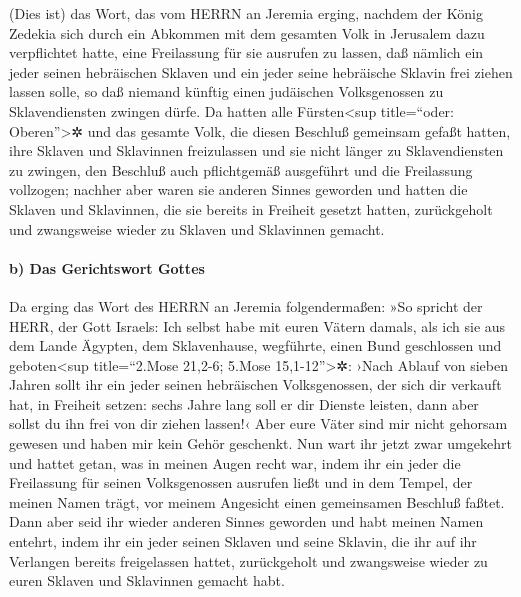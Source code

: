 (Dies ist) das Wort, das vom HERRN an Jeremia erging,
nachdem der König Zedekia sich durch ein Abkommen mit dem gesamten Volk
in Jerusalem dazu verpflichtet hatte, eine Freilassung für sie ausrufen
zu lassen, daß nämlich ein jeder seinen hebräischen
Sklaven und ein jeder seine hebräische Sklavin frei ziehen lassen solle,
so daß niemand künftig einen judäischen Volksgenossen zu Sklavendiensten
zwingen dürfe. Da hatten alle Fürsten\textless sup
title=``oder: Oberen''\textgreater✲ und das gesamte Volk, die diesen
Beschluß gemeinsam gefaßt hatten, ihre Sklaven und Sklavinnen
freizulassen und sie nicht länger zu Sklavendiensten zu zwingen, den
Beschluß auch pflichtgemäß ausgeführt und die Freilassung vollzogen;
nachher aber waren sie anderen Sinnes geworden und hatten
die Sklaven und Sklavinnen, die sie bereits in Freiheit gesetzt hatten,
zurückgeholt und zwangsweise wieder zu Sklaven und Sklavinnen gemacht.

\hypertarget{b-das-gerichtswort-gottes}{%
\paragraph{b) Das Gerichtswort Gottes}\label{b-das-gerichtswort-gottes}}

Da erging das Wort des HERRN an Jeremia folgendermaßen:
»So spricht der HERR, der Gott Israels: Ich selbst habe
mit euren Vätern damals, als ich sie aus dem Lande Ägypten, dem
Sklavenhause, wegführte, einen Bund geschlossen und geboten\textless sup
title=``2.Mose 21,2-6; 5.Mose 15,1-12''\textgreater✲:
›Nach Ablauf von sieben Jahren sollt ihr ein jeder seinen
hebräischen Volksgenossen, der sich dir verkauft hat, in Freiheit
setzen: sechs Jahre lang soll er dir Dienste leisten, dann aber sollst
du ihn frei von dir ziehen lassen!‹ Aber eure Väter sind mir nicht
gehorsam gewesen und haben mir kein Gehör geschenkt. Nun
wart ihr jetzt zwar umgekehrt und hattet getan, was in meinen Augen
recht war, indem ihr ein jeder die Freilassung für seinen Volksgenossen
ausrufen ließt und in dem Tempel, der meinen Namen trägt, vor meinem
Angesicht einen gemeinsamen Beschluß faßtet. Dann aber
seid ihr wieder anderen Sinnes geworden und habt meinen Namen entehrt,
indem ihr ein jeder seinen Sklaven und seine Sklavin, die ihr auf ihr
Verlangen bereits freigelassen hattet, zurückgeholt und zwangsweise
wieder zu euren Sklaven und Sklavinnen gemacht habt.

